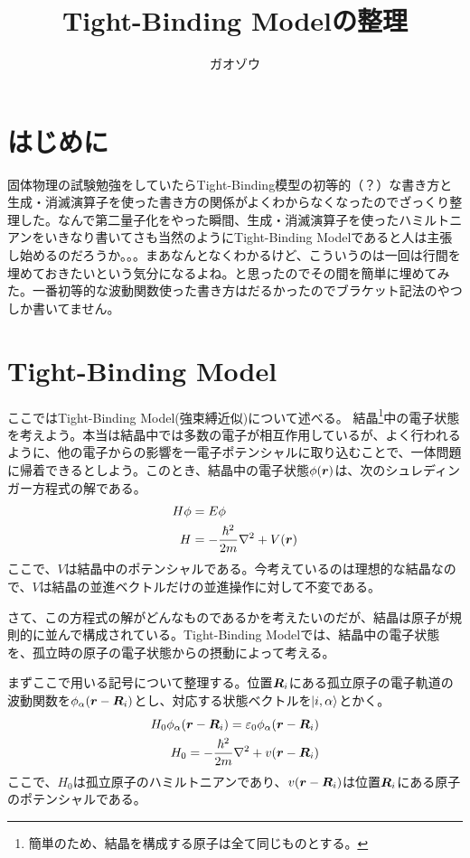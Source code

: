 \documentclass[uplatex,dvipdfmx]{jsarticle}
\title{Tight-Binding Modelの整理}
\author{ガオゾウ}
\begin{document}
\maketitle

\section{はじめに}
    固体物理の試験勉強をしていたらTight-Binding模型の初等的（？）な書き方と生成・消滅演算子を使った書き方の関係がよくわからなくなったのでざっくり整理した。なんで第二量子化をやった瞬間、生成・消滅演算子を使ったハミルトニアンをいきなり書いてさも当然のようにTight-Binding Modelであると人は主張し始めるのだろうか。。。まあなんとなくわかるけど、こういうのは一回は行間を埋めておきたいという気分になるよね。と思ったのでその間を簡単に埋めてみた。一番初等的な波動関数使った書き方はだるかったのでブラケット記法のやつしか書いてません。

\section{Tight-Binding Model}
    ここではTight-Binding Model(強束縛近似)について述べる。
    結晶\footnote{簡単のため、結晶を構成する原子は全て同じものとする。}中の電子状態を考えよう。本当は結晶中では多数の電子が相互作用しているが、よく行われるように、他の電子からの影響を一電子ポテンシャルに取り込むことで、一体問題に帰着できるとしよう。このとき、結晶中の電子状態$\phi(\vb*{r})$は、次のシュレディンガー方程式の解である。
    \begin{align}
        H\phi &= E\phi \\
        H &= -\frac{\hbar^2}{2m}\nabla^2 + V(\vb*{r})
    \end{align}
    ここで、$V$は結晶中のポテンシャルである。今考えているのは理想的な結晶なので、$V$は結晶の並進ベクトルだけの並進操作に対して不変である。

    さて、この方程式の解がどんなものであるかを考えたいのだが、結晶は原子が規則的に並んで構成されている。Tight-Binding Modelでは、結晶中の電子状態を、孤立時の原子の電子状態からの摂動によって考える。

    まずここで用いる記号について整理する。位置$\vb*{R}_i$にある孤立原子の電子軌道の波動関数を$\phi_\alpha(\vb*{r}-\vb*{R}_i)$とし、対応する状態ベクトルを$\ket{i,\alpha}$とかく。
    \begin{align}
        H_0 \phi_\alpha(\vb*{r}-\vb*{R}_i) = \varepsilon_0 \phi_\alpha(\vb*{r}-\vb*{R}_i) \\
        H_0 = -\frac{\hbar^2}{2m}\nabla^2 + v(\vb*{r}-\vb*{R}_i)
    \end{align}
    ここで、$H_0$は孤立原子のハミルトニアンであり、$v(\vb*{r}-\vb*{R}_i)$は位置$\vb*{R}_i$にある原子のポテンシャルである。
    \vspace{0.5cm}
\end{document}
